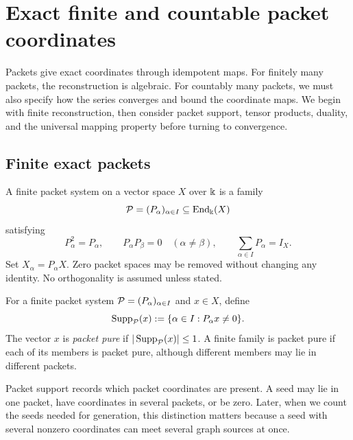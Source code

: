 \section{Exact finite and countable packet coordinates}



\begin{readerroadmap}
Packets give exact coordinates through idempotent maps.  For finitely many packets, the reconstruction is algebraic.  For countably many packets, we must also specify how the series converges and bound the coordinate maps.  We begin with finite reconstruction, then consider packet support, tensor products, duality, and the universal mapping property before turning to convergence.
\end{readerroadmap}
\subsection{Finite exact packets}

\begin{definition}
\label{def:packet-system}
A finite packet system on a vector space $X$ over $\Bbbk$ is a family
\[
\mathcal P=(P_\alpha)_{\alpha\in I}\subseteq\operatorname{End}_{\Bbbk}(X)
\]
satisfying
\[
P_\alpha^2=P_\alpha,
\qquad
P_\alpha P_\beta=0\quad(\alpha\neq\beta),
\qquad
\sum_{\alpha\in I}P_\alpha=I_X.
\]
Set $X_\alpha=P_\alpha X$.  Zero packet spaces may be removed without changing any identity.  No orthogonality is assumed unless stated.
\end{definition}

\begin{definition}
\label{def:packet-support}
For a finite packet system \(\mathcal P=(P_\alpha)_{\alpha\in I}\) and \(x\in X\), define
\[
\operatorname{Supp}_{\mathcal P}(x)
:=
\{\alpha\in I:P_\alpha x\neq0\}.
\]
The vector \(x\) is \emph{packet pure} if \(|\operatorname{Supp}_{\mathcal P}(x)|\leq1\).  A finite family is packet pure if each of its members is packet pure, although different members may lie in different packets.
\end{definition}

\begin{interpretation}
Packet support records which packet coordinates are present.  A seed may lie in one packet, have coordinates in several packets, or be zero.  Later, when we count the seeds needed for generation, this distinction matters because a seed with several nonzero coordinates can meet several graph sources at once.
\end{interpretation}


